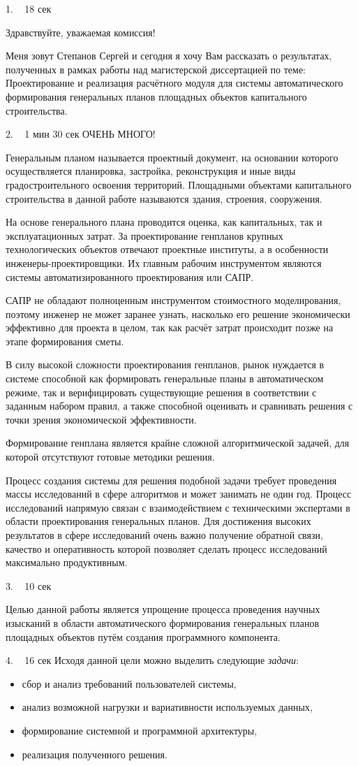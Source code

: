 \documentclass[11pt]{article}
\begin{document}
1. ~ 18 сек

Здравствуйте, уважаемая комиссия!

Меня зовут Степанов Сергей и сегодня я хочу Вам рассказать о результатах,
полученных в рамках работы над магистерской диссертацией по теме:
Проектирование и реализация расчётного модуля для системы автоматического формирования
генеральных планов площадных объектов капитального строительства.


2. ~ 1 мин 30 сек ОЧЕНЬ МНОГО!

Генеральным планом называется
проектный документ, на основании которого осуществляется планировка,
застройка, реконструкция и иные виды градостроительного освоения территорий.
Площадными объектами капитального строительства в данной работе называются здания, строения, сооружения.

На основе генерального плана проводится оценка, как капитальных, так и эксплуатационных затрат.
За проектирование генпланов крупных технологических объектов отвечают проектные институты,
а в особенности инженеры-проектировщики. Их главным рабочим инструментом
являются системы автоматизированного проектирования или САПР.

САПР не обладают полноценным инструментом стоимостного моделирования,
поэтому инженер не может заранее узнать,
насколько его решение экономически эффективно для проекта в целом,
так как расчёт затрат происходит позже на этапе формирования сметы.

В силу высокой сложности проектирования генпланов,
рынок нуждается в системе способной как формировать генеральные планы в автоматическом режиме,
так и верифицировать существующие решения в соответствии с заданным набором правил,
а также способной оценивать и сравнивать решения с точки зрения экономической эффективности.

Формирование генплана является крайне сложной алгоритмической задачей,
для которой отсутствуют готовые методики решения.

Процесс создания системы для решения подобной задачи требует
проведения массы исследований в сфере алгоритмов и может занимать не один год.
Процесс исследований напрямую связан с взаимодействием с техническими экспертами
в области проектирования генеральных планов.
Для достижения высоких результатов в сфере исследований очень важно получение обратной связи,
качество и оперативность которой позволяет сделать процесс исследований максимально продуктивным.

3. ~ 10 сек

Целью данной работы является
упрощение процесса проведения научных изысканий
в области автоматического формирования генеральных планов площадных объектов
путём создания программного компонента.

4. ~ 16 сек
Исходя данной цели можно выделить следующие \textit{задачи}:
\begin{itemize}
    \item сбор и анализ требований пользователей системы,
    \item анализ возможной нагрузки и вариативности используемых данных,
    \item формирование системной и программной архитектуры,
    \item реализация полученного решения.
\end{itemize}
\end{document}
